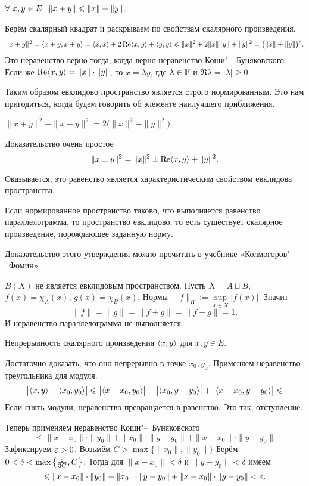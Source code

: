 \begin{Ut}
  $\forall\ x,y\in E\pau \|x+y\|\le \|x\| + \|y\|$.
\end{Ut}
\begin{Proof}
  Берём скалярный квадрат и раскрываем по свойствам скалярного произведения.
  \[
    \|x+y\|^2 = \langle x+y,x+y\rangle  = \langle x,x\rangle  + 2\mathop{\text{Re}}\langle x,y\rangle  + \langle y,y\rangle \leqslant \|x\|^2 + 2\|x\|\|y\|+ \|y\|^2 = \big(\|x\|+\|y\|\big)^2.
  \]
Это неравенство верно тогда, когда верно неравенство Коши"--~Буняковского. Если же $\mathop{\text{Re}}\langle x,y\rangle =\|x\|\cdot\|y\|$, то $x = \lambda y$, где $\lambda\in\mathbb F$ и $\Re\lambda =|\lambda|\ge 0$.
\end{Proof}

Таким образом евклидово пространство является строго нормированным. Это нам пригодиться, когда будем говорить об элементе наилучшего приближения.

\begin{Ut}
  $\|x+y\|^2 + \|x-y\|^2 = 2\big(\|x\|^2+\|y\|^2\big)$.
\end{Ut}
\begin{Proof}
  Доказательство очень простое
\[
  \|x\pm y\|^2 = \|x\|^2\pm\mathop{\text{Re}}\langle x,y\rangle  + \|y\|^2.
\]
\end{Proof}

Оказывается, это равенство является характеристическим свойством евклидова пространства.
\begin{Ut}
  Если нормированное пространство таково, что выполняется равенство параллелограмма, то пространство евклидово, то есть существует скалярное произведение, порождающее заданную норму.
\end{Ut}

Доказательство этого утверждения можно прочитать в учебнике «Колмогоров"--~Фомин».

$B(X)$ не является евклидовым пространством. Пусть $X = A\sqcup B$, $f(x) = \chi_A(x)$, $g(x) = \chi_B(x)$, Нормы $\|f\|_B:=\sup\limits_{x\in X}\big|f(x)\big|$. Значит
\[
  \|f\| = \|g\| = \|f+g\| = \|f-g\|=1.
\]
И неравенство параллелограмма не выполняется.

\begin{Ut}\label{ScalarProductContinious}
  Непрерывность скалярного произведения $\langle x,y\rangle $ для $x,y\in E$.
\end{Ut}
\begin{Proof}
  Достаточно доказать, что оно пепрерывно в точке $x_0,y_0$. Применяем неравенство треугольника для модуля.
\[
  \big|\langle x,y\rangle  - \langle x_0,y_0\rangle \big|\leqslant \big|\langle x-x_0,y_0\rangle\big|+\big|\langle x_0,y-y_0\rangle\big| + \big|\langle x-x_0,y-y_0\rangle\big|\leqslant
\]
Если снять модули, неравенство превращается в равенство. Это так, отступление.

Теперь применяем неравенство Коши"--~Буняковского
\[
  \le \|x-x_0\|\cdot\|y_0\| + \|x_0\|\cdot \|y-y_0\| + \|x-x_0\|\cdot \|y-y_0\|
\]
Зафиксируем $\varepsilon> 0$. Возьмём $C> \max\big\{\|x_0\|,\|y_0\|\big\}$ Берём $0<\delta< \max\left\{ \frac{\varepsilon}{3C},C\right\}$. Тогда для $\|x-x_0\|< \delta$ и $\|y-y_0\|< \delta$ имеем
\[
  \leqslant \|x-x_0\|\cdot\|y_0\| + \|x_0\|\cdot \|y-y_0\| + \|x-x_0\|\cdot \|y-y_0\| < \varepsilon.
\]
\end{Proof}

